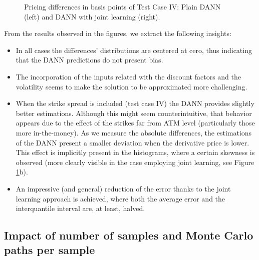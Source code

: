 		\begin{figure}[h!]
			\centering
			\caption{Pricing differences in basis points of Test Case IV: Plain DANN (left) and DANN with joint learning (right).}
			\label{fig:diferences_test_IV}
		\end{figure}

		From the results observed in the figures, we extract the following insights:
		\begin{itemize}
			\item In all cases the differences' distributions are centered at cero, thus indicating that the DANN predictions do not present bias.
			
			\item The incorporation of the inputs related with the discount factors and the volatility seems to make the solution to be approximated more challenging.

			\item When the strike spread is included (test case IV) the DANN provides slightly better estimations. Although this might seem counterintuitive, that behavior appears due to the effect of the strikes far from ATM level (particularly those more in-the-money). As we measure the absolute differences, the estimations of the DANN present a smaller deviation when the derivative price is lower. This effect is implicitly present in the histograms, where a certain skewness is observed (more clearly visible in the case employing joint learning, see Figure \ref{fig:diferences_test_IV}b).

			\item An impressive (and general) reduction of the error thanks to the joint learning approach is achieved, where both the average error and the interquantile interval are, at least, halved.
		\end{itemize}


	\subsection{Impact of number of samples and Monte Carlo paths per sample}\label{sec:MCpaths}

